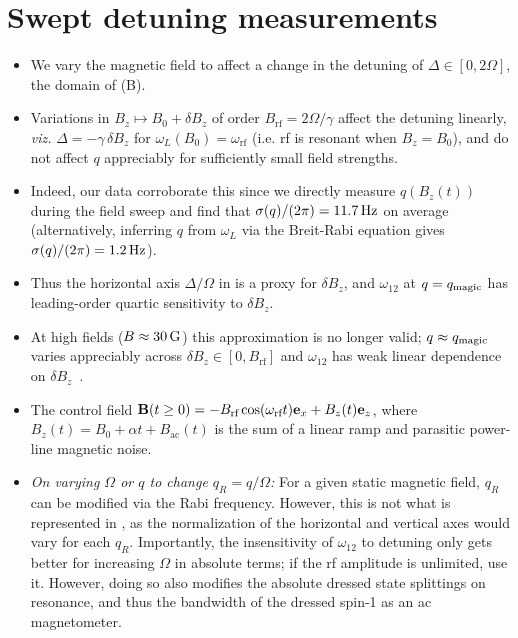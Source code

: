 \documentclass[aps,prl,reprint,superscriptaddress,floatfix]{revtex4-1}
\begin{document}
\section{Swept detuning measurements}
\label{sec:swept_detuning}
\begin{itemize}
    \item We vary the magnetic field to affect a change in the detuning of $\Delta \in [0, 2\Omega]$, the domain of (B).
    \item Variations in $B_z \mapsto B_0 + \delta B_z$ of order $B_{\text{rf}} = 2\Omega/\gamma$ affect the detuning linearly, \textit{viz.} $\Delta = - \gamma \, \delta B_z$ for $\omega_L(B_0) = \omega_{\text{rf}}$ (i.e. rf is resonant when $B_z=B_0$), and do not affect $q$ appreciably for sufficiently small field strengths.
    \item Indeed, our data corroborate this since we directly measure $q(B_z(t))$ during the field sweep and find that $\sigma(q)/(2\pi) = \unit[11.7]{Hz}$ on average (alternatively, inferring $q$ from $\omega_L$ via the Breit-Rabi equation gives $\sigma(q)/(2\pi) = \unit[1.2]{Hz}$).
    \item Thus the horizontal axis $\Delta/\Omega$ in  is a proxy for $\delta B_z$, and $\omega_{12}$ at $q=q_{\text{magic}}$ has leading-order quartic sensitivity to $\delta B_z$.
        \item At high fields ($B\approx \unit[30]{G}$) this approximation is no longer valid; $q \approx q_{\text{magic}}$ varies appreciably across $\delta B_z \in [0, B_{\text{rf}}]$ and $\omega_{12}$ has weak linear dependence on $\delta B_z$~\cite{lundblad_synthetic_2017}.
    \item[\checkmark]  The control field $\mathbf{B}(t \geq 0) = -B_{\text{rf}} \cos (\omega_{\text{rf}} t) \mathbf{e}_x + B_z(t) \mathbf{e}_z$, where $B_z(t) = B_0 + \alpha t + B_{\text{ac}}(t)$ is the sum of a linear ramp and parasitic power-line magnetic noise.
    \item \textit{On varying $\Omega$ or $q$ to change $q_R=q/\Omega$:}
    For a given static magnetic field, $q_R$ can be modified via the Rabi frequency.
    However, this is not what is represented in , as the normalization of the horizontal and vertical axes would vary for each $q_R$.
    Importantly, the insensitivity of $\omega_{12}$ to detuning only gets better for increasing $\Omega$ in absolute terms; if the rf amplitude is unlimited, use it.
    However, doing so also modifies the absolute dressed state splittings on resonance, and thus the bandwidth of the dressed spin-1 as an ac magnetometer.

\end{itemize}
\end{document}
